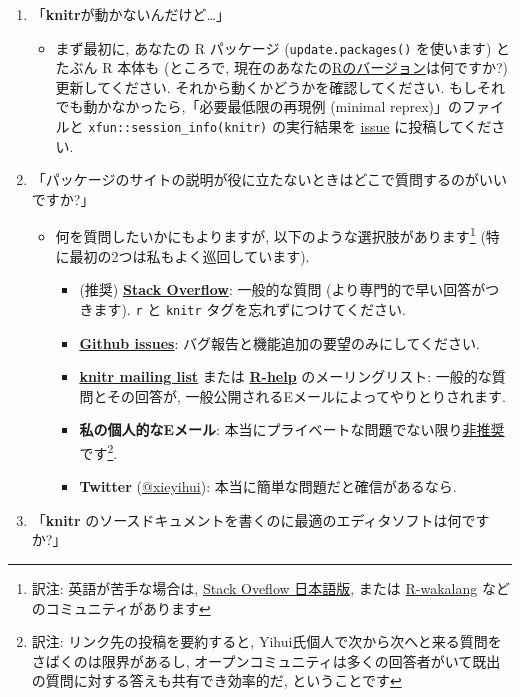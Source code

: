 \documentclass[
  lualatex,ja=standard,jafont=noto-otf]{bxjsreport}
\providecommand{\tightlist}{%
  \setlength{\itemsep}{0pt}\setlength{\parskip}{0pt}}
\begin{document}
\begin{enumerate}
\def\labelenumi{\arabic{enumi}.}
\tightlist
\item
  「\textbf{knitr}が動かないんだけど\ldots」

  \begin{itemize}
  \tightlist
  \item
    まず最初に, あなたの R パッケージ (\texttt{update.packages()}
    を使います) とたぶん R 本体も (ところで,
    現在のあなたの\href{https://cran.rstudio.com}{Rのバージョン}は何ですか?)
    更新してください. それから動くかどうかを確認してください.
    もしそれでも動かなかったら,「必要最低限の再現例 (minimal
    reprex)」のファイルと
    \texttt{xfun::session\_info(\textquotesingle{}knitr\textquotesingle{})}
    の実行結果を \href{https://github.com/yihui/knitr/issues}{issue}
    に投稿してください.
  \end{itemize}
\item
  「パッケージのサイトの説明が役に立たないときはどこで質問するのがいいですか?」

  \begin{itemize}
  \tightlist
  \item
    何を質問したいかにもよりますが,
    以下のような選択肢があります\footnote{訳注: 英語が苦手な場合は,
      \href{https://ja.stackoverflow.com/}{Stack Oveflow 日本語版},
      または
      \href{https://r-wakalang.slack.com/messages/general/}{R-wakalang}
      などのコミュニティがあります}
    (特に最初の2つは私もよく巡回しています).

    \begin{itemize}
    \tightlist
    \item
      (推奨)
      \textbf{\href{http://stackoverflow.com/questions/tagged/knitr}{Stack
      Overflow}}: 一般的な質問 (より専門的で早い回答がつきます).
      \texttt{r} と \texttt{knitr} タグを忘れずにつけてください.
    \item
      \textbf{\href{https://github.com/yihui/knitr/issues}{Github
      issues}}: バグ報告と機能追加の要望のみにしてください.
    \item
      \textbf{\href{https://groups.google.com/group/knitr}{knitr mailing
      list}} または
      \textbf{\href{http://www.r-project.org/mail.html}{R-help}}
      のメーリングリスト: 一般的な質問とその回答が,
      一般公開されるEメールによってやりとりされます.
    \item
      \textbf{私の個人的なEメール}:
      本当にプライベートな問題でない限り\href{https://yihui.org/en/2017/08/so-gh-email/}{非推奨}です\footnote{訳注:
        リンク先の投稿を要約すると,
        Yihui氏個人で次から次へと来る質問をさばくのは限界があるし,
        オープンコミュニティは多くの回答者がいて既出の質問に対する答えも共有でき効率的だ,
        ということです}.
    \item
      \textbf{Twitter} (\href{https://twitter.com/xieyihui}{@xieyihui}):
      本当に簡単な問題だと確信があるなら.
    \end{itemize}
  \end{itemize}
\item
  「\textbf{knitr}
  のソースドキュメントを書くのに最適のエディタソフトは何ですか?」


\end{enumerate}
\end{document}
